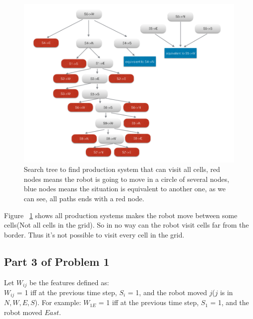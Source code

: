 \documentclass[paper=a4, fontsize=11pt]{scrartcl} %
\numberwithin{equation}{section} %
\numberwithin{figure}{section} %
\numberwithin{table}{section} %
\begin{document}
\begin{figure}[p]
    \vspace{\fill}
    \includegraphics[scale=0.5]{image6.png}
    \caption{Search tree to find production system that can visit all cells, 
        red nodes means the robot is going to move in a circle of several nodes,
        blue nodes means the situation is equivalent to another one, as we can see,
        all paths ends with a red node.}
    \label{fig:Problem1.2.2}
\end{figure}

Figure ~\ref{fig:Problem1.2.2} shows all production systems makes the robot move between 
some cells(Not all cells in the grid).
So in no way can the robot visit cells far from the border. 
Thus it's not possible to visit every cell in the grid.\\

\subsection{Part 3 of Problem 1}

Let $W_{ij}$ be the features defined as:\\
$W_{ij}$ = 1 iff at the previous time step, $S_i$ = 1, and the robot moved $j$($j$ is in ${N, W, E, S}$).
For example:
$W_{1E}$ = 1 iff at the previous time step, $S_1$ = 1, and the robot moved $East$.\\
\end{document}
